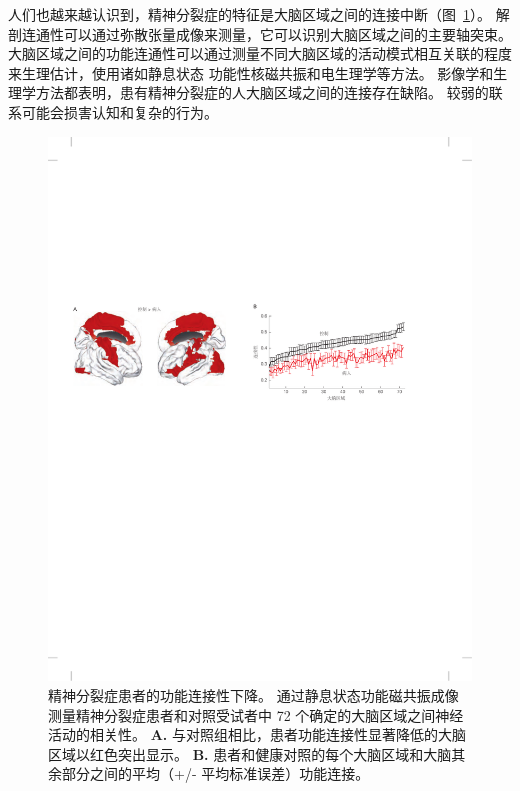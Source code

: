 人们也越来越认识到，精神分裂症的特征是大脑区域之间的连接中断（图~\ref{fig:60_5}）。
解剖连通性可以通过弥散张量成像来测量，它可以识别大脑区域之间的主要轴突束。
大脑区域之间的功能连通性可以通过测量不同大脑区域的活动模式相互关联的程度来生理估计，使用诸如静息状态 功能性核磁共振和电生理学等方法。
影像学和生理学方法都表明，患有精神分裂症的人大脑区域之间的连接存在缺陷。
较弱的联系可能会损害认知和复杂的行为。


\begin{figure}[htbp]
	\centering
	\includegraphics[width=1.0\linewidth]{chap60/fig_60_5}
	\caption{精神分裂症患者的功能连接性下降。
		通过静息状态功能磁共振成像测量精神分裂症患者和对照受试者中 72 个确定的大脑区域之间神经活动的相关性\cite{lynall2010functional}。
		\textbf{A.} 与对照组相比，患者功能连接性显著降低的大脑区域以红色突出显示。
		\textbf{B.} 患者和健康对照的每个大脑区域和大脑其余部分之间的平均（+/- 平均标准误差）功能连接。}
	\label{fig:60_5}
\end{figure}



